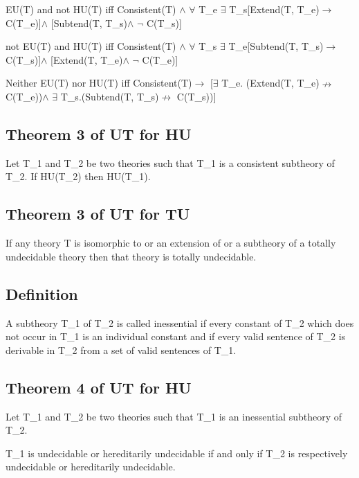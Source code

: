 EU(T) and not HU(T) iff Consistent(T) $\land$  $\forall$ T\_e $\exists$ T\_s{[}Extend(T,
T\_e)$\to$ C(T\_e){]}$\land$ {[}Subtend(T, T\_s)$\land$ $\neg$ C(T\_s){]}

not EU(T) and HU(T) iff Consistent(T) $\land$  $\forall$ T\_s $\exists$ T\_e{[}Subtend(T,
T\_s)$\to$ C(T\_s){]}$\land$ {[}Extend(T, T\_e)$\land$ $\neg$ C(T\_e){]}

Neither EU(T) nor HU(T) iff Consistent(T)$\to$ {[}$\exists$ T\_e. (Extend(T,
T\_e)$\nrightarrow$ C(T\_e))$\land$ $\exists$ T\_s.(Subtend(T, T\_s)$\nrightarrow$ C(T\_s)){]}

\hypertarget{theorem-3-of-ut-for-hu}{%
\subsection{Theorem 3 of UT for HU}\label{theorem-3-of-ut-for-hu}}

Let T\_1 and T\_2 be two theories such that T\_1 is a consistent
subtheory of T\_2. If HU(T\_2) then HU(T\_1).

\hypertarget{theorem-3-of-ut-for-tu}{%
\subsection{Theorem 3 of UT for TU}\label{theorem-3-of-ut-for-tu}}

If any theory T is isomorphic to or an extension of or a subtheory of a
totally undecidable theory then that theory is totally undecidable.

\hypertarget{definition}{%
\subsection{Definition}\label{definition}}

A subtheory T\_1 of T\_2 is called inessential if every constant of T\_2
which does not occur in T\_1 is an individual constant and if every
valid sentence of T\_2 is derivable in T\_2 from a set of valid
sentences of T\_1.

\hypertarget{theorem-4-of-ut-for-hu}{%
\subsection{Theorem 4 of UT for HU}\label{theorem-4-of-ut-for-hu}}

Let T\_1 and T\_2 be two theories such that T\_1 is an inessential
subtheory of T\_2.

T\_1 is undecidable or hereditarily undecidable if and only if T\_2 is
respectively undecidable or hereditarily undecidable.

